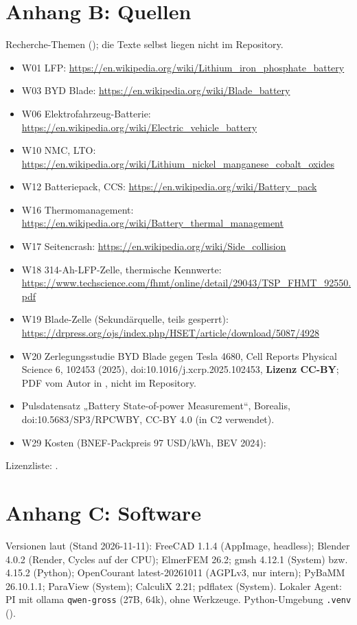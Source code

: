 \documentclass[10pt,a4paper]{article}
\begin{document}
\section*{Anhang B: Quellen}
Recherche-Themen (); die Texte selbst liegen nicht im Repository.
\begin{itemize}[nosep]
\item W01 LFP: \url{https://en.wikipedia.org/wiki/Lithium_iron_phosphate_battery}
\item W03 BYD Blade: \url{https://en.wikipedia.org/wiki/Blade_battery}
\item W06 Elektrofahrzeug-Batterie: \url{https://en.wikipedia.org/wiki/Electric_vehicle_battery}
\item W10 NMC, LTO: \url{https://en.wikipedia.org/wiki/Lithium_nickel_manganese_cobalt_oxides}
\item W12 Batteriepack, CCS: \url{https://en.wikipedia.org/wiki/Battery_pack}
\item W16 Thermomanagement: \url{https://en.wikipedia.org/wiki/Battery_thermal_management}
\item W17 Seitencrash: \url{https://en.wikipedia.org/wiki/Side_collision}
\item W18 314-Ah-LFP-Zelle, thermische Kennwerte: \url{https://www.techscience.com/fhmt/online/detail/29043/TSP_FHMT_92550.pdf}
\item W19 Blade-Zelle (Sekundärquelle, teils gesperrt): \url{https://drpress.org/ojs/index.php/HSET/article/download/5087/4928}
\item W20 Zerlegungsstudie BYD Blade gegen Tesla 4680, Cell Reports Physical Science 6, 102453 (2025), doi:10.1016/j.xcrp.2025.102453, \textbf{Lizenz CC-BY}; PDF vom Autor in , nicht im Repository.
\item Pulsdatensatz „Battery State-of-power Measurement“, Borealis, doi:10.5683/SP3/RPCWBY, CC-BY 4.0 (in C2 verwendet).
\item W29 Kosten (BNEF-Packpreis 97 USD/kWh, BEV 2024): 
\end{itemize}
Lizenzliste: .

\section*{Anhang C: Software}
Versionen laut  (Stand 2026-11-11): FreeCAD 1.1.4 (AppImage, headless); Blender 4.0.2 (Render, Cycles auf der CPU); ElmerFEM 26.2; gmsh 4.12.1 (System) bzw. 4.15.2 (Python);
OpenCourant latest-20261011 (AGPLv3, nur intern); PyBaMM 26.10.1.1; ParaView (System); CalculiX 2.21; pdflatex (System). Lokaler Agent: PI mit ollama \texttt{qwen-gross} (27B, 64k), ohne Werkzeuge. Python-Umgebung \texttt{.venv}
().
\end{document}
